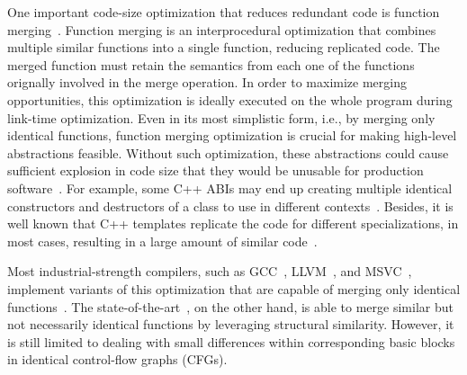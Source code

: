 One important code-size optimization that reduces redundant code is function
merging~\cite{tallam10,edler14}.
Function merging is an interprocedural optimization that combines multiple
similar functions into a single function, reducing replicated code.
The merged function must retain the semantics from each one of the functions
orignally involved in the merge operation.
In order to maximize merging opportunities, this optimization is ideally
executed on the whole program during link-time optimization.
Even in its most simplistic form, i.e., by merging only identical functions,
function merging optimization is crucial for making high-level abstractions
feasible.
Without such optimization, these abstractions could cause sufficient explosion
in code size that they would be unusable for production
software~\cite{tallam10,kwan12}.
For example, some C++ ABIs may end up creating multiple identical constructors
and destructors of a class to use in different contexts~\cite{kwan12}.
Besides, it is well known that C++ templates replicate the code for different
specializations, in most cases, resulting in a large amount of similar code~\cite{tallam10,livska14}.

Most industrial-strength compilers, such as GCC~\cite{gcc}, LLVM~\cite{llvm},
and MSVC~\cite{msvc-icf}, implement variants of this optimization that are
capable of merging only identical functions~\cite{tallam10,kwan12,livska14}.
The state-of-the-art~\cite{edler14}, on the other hand, is able to merge similar
but not necessarily identical functions by leveraging structural similarity.
However, it is still limited to dealing with small differences within
corresponding basic blocks in identical control-flow graphs (CFGs).

